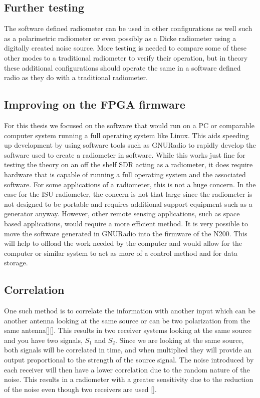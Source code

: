 \subsection{Further testing}
The software defined radiometer can be used in other configurations as well such as a polarimetric radiometer or even possibly as a Dicke radiometer using a digitally created noise source.  More testing is needed to compare some of these other modes to a traditional radiometer to verify their operation, but in theory these additional configurations should operate the same in a software defined radio as they do with a traditional radiometer.

\subsection{Improving on the FPGA firmware}

For this thesis we focused on the software that would run on a PC or comparable computer system running a full operating system like Linux.  This aids speeding up development by using software tools such as GNURadio to rapidly develop the software used to create a radiometer in software.  While this works just fine for testing the theory on an off the shelf SDR acting as a radiometer, it does require hardware that is capable of running a full operating system and the associated software.  For some applications of a radiometer, this is not a huge concern.  In the case for the ISU radiometer, the concern is not that large since the radiometer is not designed to be portable and requires additional support equipment such as a generator anyway.  However, other remote sensing applications, such as space based applications, would require a more efficient method.  It is very possible to move the software generated in GNURadio into the firmware of the N200.  This will help to offload the work needed by the computer and would allow for the computer or similar system to act as more of a control method and for data storage.  

\subsection{Correlation}  
One such method is to correlate the information with another input which can be another antenna looking at the same source or can be two polarization from the same antenna[\cite{Clapp}][\cite{Aitken}].  This results in two receiver systems looking at the same source and you have two signals, $S_1$ and $S_2$.  Since we are looking at the same source, both signals will be correlated in time, and when multiplied they will provide an output proportional to the strength of the source signal.  The noise introduced by each receiver will then have a lower correlation due to the random nature of the noise.  This results in a radiometer with a greater sensitivity due to the reduction of the noise even though two receivers are used [\cite{Fujimoto}].

